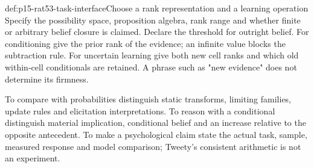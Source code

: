 \begin{hbmethod}{def:p15-rat53-task-interface}{Choose a rank representation and a learning operation}
Specify the possibility space, proposition algebra, rank range and whether
finite or arbitrary belief closure is claimed.  Declare the threshold for
outright belief.  For conditioning give the prior rank of the evidence; an
infinite value blocks the subtraction rule.  For uncertain learning give both
new cell ranks and which old within-cell conditionals are retained.  A phrase
such as "new evidence" does not determine its firmness.

To compare with probabilities distinguish static transforms, limiting
families, update rules and elicitation interpretations.  To reason with a
conditional distinguish material implication, conditional belief and an
increase relative to the opposite antecedent.  To make a psychological claim
state the actual task, sample, measured response and model comparison; Tweety's
consistent arithmetic is not an experiment.
\end{hbmethod}
